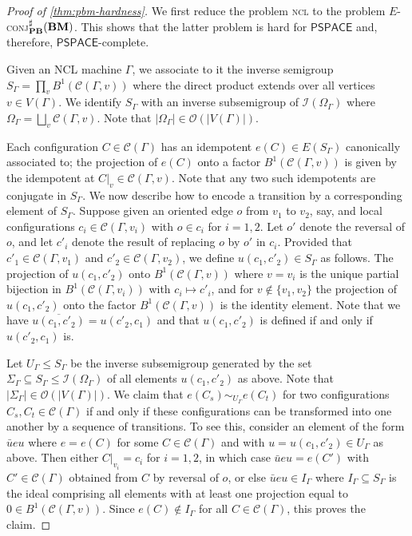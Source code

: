 \documentclass[anonymous,letter,UKenglish,cleveref,autoref,thm-restate]{lipics-v2021}
\renewcommand{\leq}{\leqslant}
\newcommand{\sse}{\subseteq}
\newcommand{\bigO}{\mathcal{O}}
\newcommand{\PSPACE}{\ensuremath{\mathsf{PSPACE}}\xspace}
\newcommand{\ISym}{\cI}
\newcommand{\cC}{\mathcal{C}}
\newcommand{\cI}{\mathcal{I}}
\theoremstyle{plain}
\theoremstyle{plain}
\newcommand{\dConjS}[2][]{\textup{\textsc{conj${}^{\sharp}_{\mathbf{#1}}\expandafter\ifx\expandafter\relax\detokenize{#2}\relax\else(#2)\fi$}}}
\newcommand{\prob}[1]{\textup{\textsc{#1}}\xspace}
\newcommand{\dNCL}{\prob{ncl}}
\newcommand{\dEConjS}[2][]{\ensuremath{E}\textnormal{-}\dConjS[#1]{#2}}
\begin{document}
\begin{proof}[Proof of \cref{thm:pbm-hardness}]
  We first reduce the problem \dNCL to the problem \dEConjS[PB]{\vBM}.
  This shows that the latter problem is hard for \PSPACE{} and, therefore, \PSPACE-complete.

  Given an NCL machine $\Gamma$, we associate to it the inverse semigroup $S_\Gamma = \prod_{v} B^1(\cC(\Gamma, v))$ where the direct product extends over all vertices $v \in V(\Gamma)$.
  We identify $S_\Gamma$ with an inverse subsemigroup of $\ISym(\Omega_\Gamma)$ where $\Omega_\Gamma = \bigsqcup_v \cC(\Gamma, v)$.
  Note that $\lvert \Omega_\Gamma \rvert \in \bigO(\lvert V(\Gamma) \rvert)$.

  Each configuration $C \in \cC(\Gamma)$ has an idempotent $e(C) \in E(S_\Gamma)$ canonically associated to;
  the projection of $e(C)$ onto a factor $B^1(\cC(\Gamma, v))$ is given by the idempotent at $C\vert_v \in \cC(\Gamma, v)$.
  Note that any two such idempotents are conjugate in $S_\Gamma$.
  We now describe how to encode a transition by a corresponding element of $S_\Gamma$.
  Suppose given an oriented edge $o$ from $v_1$ to $v_2$, say, and local configurations $c_i \in \cC(\Gamma, v_i)$ with $o \in c_i$ for $i = 1,2$.
  Let $o'$ denote the reversal of $o$, and let $c'_i$ denote the result of replacing $o$ by $o'$ in $c_i$.
  Provided that $c'_1 \in \cC(\Gamma, v_1)$ and $c'_2 \in \cC(\Gamma, v_2)$, we define $u(c_1, c'_2) \in S_\Gamma$ as follows.
  The projection of $u(c_1, c'_2)$ onto $B^1(\cC(\Gamma, v))$ where $v = v_i$ is the unique partial bijection in $B^1(\cC(\Gamma, v_i))$ with $c_i \mapsto c'_i$, and for $v \not\in \{ v_1, v_2 \}$ the projection of $u(c_1, c'_2)$ onto the factor $B^1(\cC(\Gamma, v))$ is the identity element.
  Note that we have $\overline{u(c_1, c'_2)} = u(c'_2, c_1)$ and that $u(c_1, c'_2)$ is defined if and only if $u(c'_2, c_1)$ is.

  Let $U_\Gamma \leq S_\Gamma$ be the inverse subsemigroup generated by the set $\Sigma_\Gamma \sse S_\Gamma \leq \ISym(\Omega_\Gamma)$ of all elements $u(c_1, c'_2)$ as above.
  Note that $\lvert \Sigma_\Gamma \rvert \in \bigO(\lvert V(\Gamma)\rvert)$.
  We claim that $e(C_s) \sim_{U_\Gamma} e(C_t)$ for two configurations $C_s, C_t \in \cC(\Gamma)$ if and only if these configurations can be transformed into one another by a sequence of transitions.
  To see this, consider an element of the form $\bar ueu$ where $e = e(C)$ for some $C \in \cC(\Gamma)$ and with $u = u(c_1, c'_2) \in U_\Gamma$ as above.
  Then either $C\vert_{v_i} = c_i$ for $i=1,2$, in which case $\bar u e u = e(C')$ with $C' \in \cC(\Gamma)$ obtained from $C$ by reversal of $o$, or else $\bar u e u \in I_\Gamma$ where $I_\Gamma \subseteq S_\Gamma$ is the ideal comprising all elements with at least one projection equal to $0 \in B^1(\cC(\Gamma, v))$.
  Since $e(C) \not\in I_\Gamma$ for all $C \in \cC(\Gamma)$, this proves the claim.


\end{proof}
\end{document}
